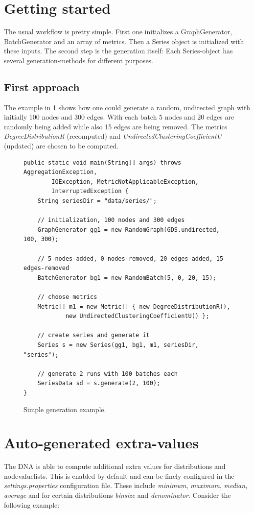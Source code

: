 \section{Getting started}
The usual workflow is pretty simple. First one initializes a GraphGenerator, BatchGenerator and an array of metrics. Then a Series object is initialized with these inputs. The second step is the generation itself: Each Series-object has several generation-methods for different purposes. 

\subsection{First approach}
The example in \ref{code:example1} shows how one could generate a random, undirected graph with initially 100 nodes and 300 edges. With each batch 5 nodes and 20 edges are randomly being added while also 15 edges are being removed. The metrics \textit{DegreeDistributionR} (recomputed) and \textit{UndirectedClusteringCoefficientU} (updated) are chosen to be computed. 

\begin{figure} [h]
\begin{lstlisting}
public static void main(String[] args) throws AggregationException,
		IOException, MetricNotApplicableException,
		InterruptedException {
	String seriesDir = "data/series/";

	// initialization, 100 nodes and 300 edges
	GraphGenerator gg1 = new RandomGraph(GDS.undirected, 100, 300);
	
	// 5 nodes-added, 0 nodes-removed, 20 edges-added, 15 edges-removed
	BatchGenerator bg1 = new RandomBatch(5, 0, 20, 15);
	
	// choose metrics
	Metric[] m1 = new Metric[] { new DegreeDistributionR(),
			new UndirectedClusteringCoefficientU() };

	// create series and generate it
	Series s = new Series(gg1, bg1, m1, seriesDir, "series");
	
	// generate 2 runs with 100 batches each
	SeriesData sd = s.generate(2, 100);
}
\end{lstlisting}
\caption{Simple generation example.}
\label{code:example1}
\end{figure}

\section{Auto-generated extra-values}
The DNA is able to compute additional extra values for distributions and nodevaluelists. This is enabled by default and can be finely configured in the \textit{settings.properties} configuration file. These include \textit{minimum}, \textit{maximum}, \textit{median}, \textit{average} and for certain distributions \textit{binsize} and \textit{denominator}. Consider the following example:\\


